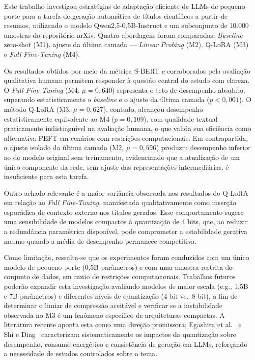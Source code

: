 

Este trabalho investigou estratégias de adaptação eficiente de LLMs de pequeno porte para a tarefa de geração automática de títulos científicos a partir de resumos, utilizando o modelo Qwen2,5-0,5B-Instruct e um subconjunto de 10.000 amostras do repositório arXiv. Quatro abordagens foram comparadas: \textit{Baseline} zero-shot (M1), ajuste da última camada --- \textit{Linear Probing} (M2), Q-LoRA (M3) e \textit{Full Fine-Tuning} (M4).

Os resultados obtidos por meio da métrica S-BERT e corroborados pela avaliação qualitativa humana permitem responder à questão central do estudo com clareza. O \textit{Full Fine-Tuning} (M4, $\mu = 0,640$) representa o teto de desempenho absoluto, superando estatisticamente o \textit{baseline} e o ajuste da última camada ($p < 0,001$). O método Q-LoRA (M3, $\mu = 0,627$), contudo, alcançou desempenho estatisticamente equivalente ao M4 ($p = 0,109$), com qualidade textual praticamente indistinguível na avaliação humana, o que valida sua eficiência como alternativa PEFT em cenários com restrições computacionais. Em contrapartida, o ajuste isolado da última camada (M2, $\mu = 0,596$) produziu desempenho inferior ao do modelo original sem treinamento, evidenciando que a atualização de um único componente da rede, sem ajuste das representações intermediárias, é insuficiente para esta tarefa.

Outro achado relevante é a maior variância observada nos resultados do Q-LoRA em relação ao \textit{Full Fine-Tuning}, manifestada qualitativamente como inserção esporádica de contexto externo nos títulos gerados. Esse comportamento sugere uma sensibilidade de modelos compactos à quantização de 4 bits, que, ao reduzir a redundância paramétrica disponível, pode comprometer a estabilidade gerativa mesmo quando a média de desempenho permanece competitiva.

Como limitação, ressalta-se que os experimentos foram conduzidos com um único modelo de pequeno porte (0,5B parâmetros) e com uma amostra restrita do conjunto de dados, em razão de restrições computacionais. Trabalhos futuros poderão expandir esta investigação avaliando modelos de maior escala (e.g., 1,5B e 7B parâmetros) e diferentes níveis de quantização (4-bit vs.\ 8-bit), a fim de determinar o limiar de compressão aceitável e verificar se a instabilidade observada no M3 é um fenômeno específico de arquiteturas compactas. A literatura recente aponta esta como uma direção promissora: Egashira et al.~\cite{egashira_exploiting_nodate} e Shi e Ding~\cite{shi_systematic_2025} caracterizam sistematicamente os impactos da quantização sobre desempenho, consumo energético e consistência de geração em LLMs, reforçando a necessidade de estudos controlados sobre o tema.